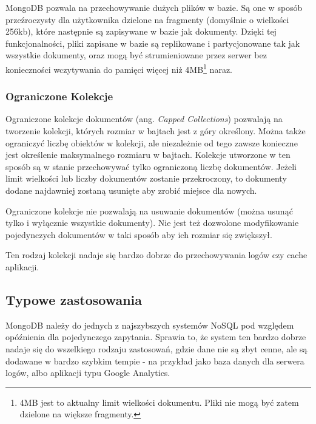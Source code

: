MongoDB pozwala na przechowywanie dużych plików w bazie.
Są one w sposób przeźroczysty dla użytkownika dzielone na fragmenty (domyślnie o wielkości 256kb), które następnie są zapisywane w bazie jak dokumenty.
Dzięki tej funkcjonalności, pliki zapisane w bazie są replikowane i partycjonowane tak jak wszystkie dokumenty, oraz mogą być strumieniowane przez serwer bez konieczności wczytywania do pamięci więcej niż 4MB\footnote{4MB jest to aktualny limit wielkości dokumentu. Pliki nie mogą być zatem dzielone na większe fragmenty.} naraz.

\subsubsection*{Ograniczone Kolekcje}

Ograniczone kolekcje dokumentów (ang. \emph{Capped Collections}) pozwalają na tworzenie kolekcji, których rozmiar w bajtach jest z góry określony.
Można także ograniczyć liczbę obiektów w kolekcji, ale niezależnie od tego zawsze konieczne jest określenie maksymalnego rozmiaru w bajtach.
Kolekcje utworzone w ten sposób są w stanie przechowywać tylko ograniczoną liczbę dokumentów.
Jeżeli limit wielkości lub liczby dokumentów zostanie przekroczony, to dokumenty dodane najdawniej zostaną usunięte aby zrobić miejsce dla nowych.

Ograniczone kolekcje nie pozwalają na usuwanie dokumentów (można usunąć tylko i wyłącznie wszystkie dokumenty).
Nie jest też dozwolone modyfikowanie pojedynczych dokumentów w taki sposób aby ich rozmiar się zwiększył.

Ten rodzaj kolekcji nadaje się bardzo dobrze do przechowywania logów czy cache aplikacji.

\subsection*{Typowe zastosowania}

MongoDB należy do jednych z najszybszych systemów NoSQL pod względem opóźnienia dla pojedynczego zapytania.
Sprawia to, że system ten bardzo dobrze nadaje się do wszelkiego rodzaju zastosowań, gdzie dane nie są zbyt cenne, ale są dodawane w bardzo szybkim tempie - na przykład jako baza danych dla serwera logów, albo aplikacji typu Google Analytics.

